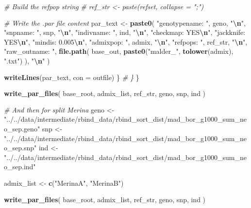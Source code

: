 \documentclass[
]{article}
\newenvironment{Shaded}{\begin{snugshade}}{\end{snugshade}}
\newcommand{\AttributeTok}[1]{\textcolor[rgb]{0.13,0.29,0.53}{#1}}
\newcommand{\CommentTok}[1]{\textcolor[rgb]{0.56,0.35,0.01}{\textit{#1}}}
\newcommand{\FunctionTok}[1]{\textcolor[rgb]{0.13,0.29,0.53}{\textbf{#1}}}
\newcommand{\NormalTok}[1]{#1}
\newcommand{\OtherTok}[1]{\textcolor[rgb]{0.56,0.35,0.01}{#1}}
\newcommand{\SpecialCharTok}[1]{\textcolor[rgb]{0.81,0.36,0.00}{\textbf{#1}}}
\newcommand{\StringTok}[1]{\textcolor[rgb]{0.31,0.60,0.02}{#1}}
\begin{document}
\begin{Shaded}
\begin{Highlighting}[]
    \CommentTok{\# Build the refpop string}
    \CommentTok{\# ref\_str \textless{}{-} paste(refset, collapse = ";")}

    \CommentTok{\# Write the .par file content}
\NormalTok{    par\_text }\OtherTok{\textless{}{-}} \FunctionTok{paste0}\NormalTok{(}
      \StringTok{"genotypename: "}\NormalTok{, geno, }\StringTok{"}\SpecialCharTok{\textbackslash{}n}\StringTok{"}\NormalTok{,}
      \StringTok{"snpname: "}\NormalTok{, snp, }\StringTok{"}\SpecialCharTok{\textbackslash{}n}\StringTok{"}\NormalTok{,}
      \StringTok{"indivname: "}\NormalTok{, ind, }\StringTok{"}\SpecialCharTok{\textbackslash{}n}\StringTok{"}\NormalTok{,}
      \StringTok{"checkmap: YES}\SpecialCharTok{\textbackslash{}n}\StringTok{"}\NormalTok{,}
      \StringTok{"jackknife: YES}\SpecialCharTok{\textbackslash{}n}\StringTok{"}\NormalTok{,}
      \StringTok{"mindis: 0.005}\SpecialCharTok{\textbackslash{}n}\StringTok{"}\NormalTok{,}
      \StringTok{"admixpop: "}\NormalTok{, admix, }\StringTok{"}\SpecialCharTok{\textbackslash{}n}\StringTok{"}\NormalTok{,}
      \StringTok{"refpops: "}\NormalTok{, ref\_str, }\StringTok{"}\SpecialCharTok{\textbackslash{}n}\StringTok{"}\NormalTok{,}
      \StringTok{"raw\_outname: "}\NormalTok{, }\FunctionTok{file.path}\NormalTok{(}
\NormalTok{        base\_out,}
        \FunctionTok{paste0}\NormalTok{(}\StringTok{"malder\_"}\NormalTok{, }\FunctionTok{tolower}\NormalTok{(admix), }\StringTok{".txt"}\NormalTok{)}
\NormalTok{      ), }\StringTok{"}\SpecialCharTok{\textbackslash{}n}\StringTok{"}
\NormalTok{    )}

    \FunctionTok{writeLines}\NormalTok{(par\_text, }\AttributeTok{con =}\NormalTok{ outfile)}
\NormalTok{  \}}
  \CommentTok{\# \}}
\NormalTok{\}}

\FunctionTok{write\_par\_files}\NormalTok{(}
\NormalTok{  base\_root,}
\NormalTok{  admix\_list,}
\NormalTok{  ref\_str,}
\NormalTok{  geno,}
\NormalTok{  snp,}
\NormalTok{  ind}
\NormalTok{)}

\CommentTok{\# And then for split Merina}
\NormalTok{geno }\OtherTok{\textless{}{-}} \StringTok{"../../data/intermediate/rbind\_data/rbind\_sort\_dist/mad\_bor\_g1000\_sum\_neo\_sep.geno"}
\NormalTok{snp }\OtherTok{\textless{}{-}} \StringTok{"../../data/intermediate/rbind\_data/rbind\_sort\_dist/mad\_bor\_g1000\_sum\_neo\_sep.snp"}
\NormalTok{ind }\OtherTok{\textless{}{-}} \StringTok{"../../data/intermediate/rbind\_data/rbind\_sort\_dist/mad\_bor\_g1000\_sum\_neo\_sep.ind"}

\NormalTok{admix\_list }\OtherTok{\textless{}{-}} \FunctionTok{c}\NormalTok{(}\StringTok{"MerinaA"}\NormalTok{, }\StringTok{"MerinaB"}\NormalTok{)}

\FunctionTok{write\_par\_files}\NormalTok{(}
\NormalTok{  base\_root,}
\NormalTok{  admix\_list,}
\NormalTok{  ref\_str,}
\NormalTok{  geno,}
\NormalTok{  snp,}
\NormalTok{  ind}
\NormalTok{)}
\end{Highlighting}
\end{Shaded}
\end{document}
